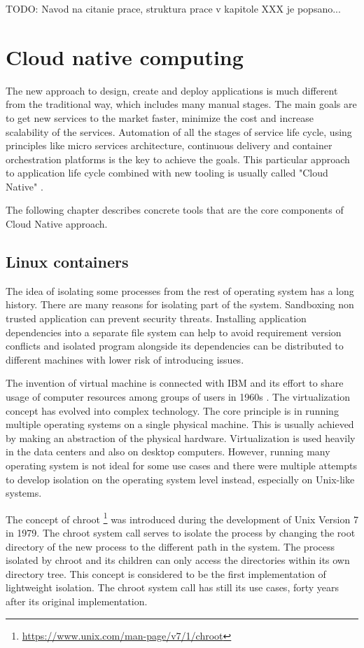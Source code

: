 \documentclass[
  digital, %
  twoside, %
  table,   %
  lof,     %
  lot,     %
]{fithesis3}
\begin{document}
TODO: Navod na citanie prace, struktura prace v kapitole XXX je popsano...

\chapter{Cloud native computing} \label{chap:cloud_native}
The new approach to design, create and deploy applications is much different from the traditional way, which includes many manual stages. The main goals are to get new services to the market faster, minimize the cost and increase scalability of the services. Automation of all the stages of service life cycle, using principles like micro services architecture, continuous delivery and container orchestration platforms is the key to achieve the goals. This particular approach to application life cycle combined with new tooling is usually called "Cloud Native" \cite{cloud_native}.

The following chapter describes concrete tools that are the core components of Cloud Native approach.

\section{Linux containers} \label{sec:containers}
The idea of isolating some processes from the rest of operating system has a long history. There are many reasons for isolating part of the system. Sandboxing non trusted application can prevent security threats. Installing application dependencies into a separate file system can help to avoid requirement version conflicts and isolated program alongside its dependencies can be distributed to different machines with lower risk of introducing issues.

The invention of virtual machine is connected with IBM and its effort to share usage of computer resources among groups of users in 1960s \cite{vm_history}. The virtualization concept has evolved into complex technology. The core principle is in running multiple operating systems on a single physical machine. This is usually achieved by making an abstraction of the physical hardware. Virtualization is used heavily in the data centers and also on desktop computers. However, running many operating system is not ideal for some use cases and there were multiple attempts to develop isolation on the operating system level instead, especially on Unix-like systems.

The concept of chroot \footnote{\url{https://www.unix.com/man-page/v7/1/chroot}} was introduced during the development of Unix Version 7 in 1979. The chroot system call serves to isolate the process by changing the root directory of the new process to the different path in the system. The process isolated by chroot and its children can only access the directories within its own directory tree. This concept is considered to be the first implementation of lightweight isolation. The chroot system call has still its use cases, forty years after its original implementation.
\end{document}
